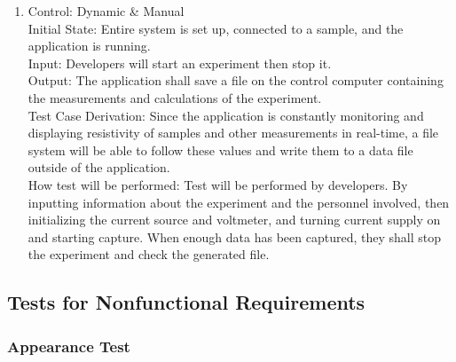 \documentclass[12pt, titlepage]{article}
\begin{document}
\begin{enumerate}[{FR-T}1.]
    \item Control: Dynamic \& Manual\\
    Initial State: Entire system is set up, connected to a sample, and the application is running.\\
    Input: Developers will start an experiment then stop it.\\
    Output: The application shall save a file on the control computer containing the measurements and calculations of the experiment.\\
    Test Case Derivation: Since the application is constantly monitoring and displaying resistivity of samples and other measurements in real-time, a file system will be able to follow these values and write them to a data file outside of the application.\\
    How test will be performed: Test will be performed by developers. By inputting information about the experiment and the personnel involved, then initializing the current source and voltmeter, and turning current supply on and starting capture. When enough data has been captured, they shall stop the experiment and check the generated file.


\end{enumerate}

\subsection{Tests for Nonfunctional Requirements}

\subsubsection{Appearance Test}
\end{document}
